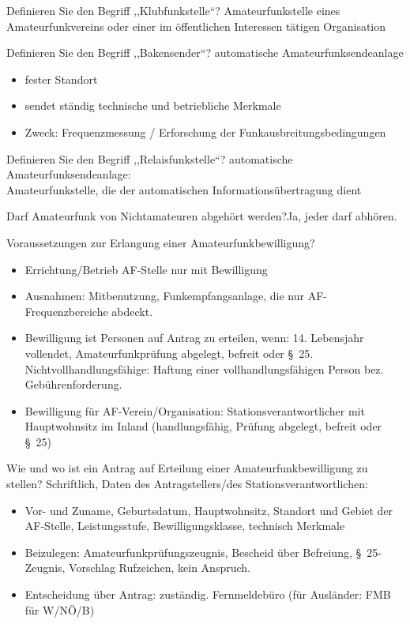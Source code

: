 \documentclass[avery5371,grid,frame,a4paper]{flashcards}
\newcommand{\card}[3]{
  \begin{flashcard}[{\chap} -- #1]{#2}#3\end{flashcard}
}
\begin{document}
\card{22}{Definieren Sie den Begriff ,,Klubfunkstelle``?}{
  Amateurfunkstelle eines Amateurfunkvereins oder einer im öffentlichen Interessen tätigen Organisation
}

\card{23}{Definieren Sie den Begriff ,,Bakensender``?}{
  automatische Amateurfunksendeanlage
  \begin{itemize}
    \item fester Standort
    \item sendet ständig technische und betriebliche Merkmale
    \item Zweck: Frequenzmessung / Erforschung der Funkausbreitungsbedingungen
  \end{itemize}
}

\card{24}{Definieren Sie den Begriff ,,Relaisfunkstelle``?}{
  automatische Amateurfunksendeanlage: \\
  Amateurfunkstelle, die der automatischen Informationsübertragung dient
}

\card{25}{Darf Amateurfunk von Nichtamateuren abgehört werden?}{Ja, jeder darf abhören.}

\card{26}{Voraussetzungen zur Erlangung einer Amateurfunkbewilligung?}{
  \small
  \begin{itemize}
    \item Errichtung/Betrieb AF-Stelle nur mit Bewilligung
    \item Ausnahmen: Mitbenutzung, Funkempfangsanlage, die nur AF-Frequenzbereiche abdeckt.
    \item Bewilligung ist Personen auf Antrag zu erteilen, wenn: 14. Lebensjahr vollendet, Amateurfunkprüfung abgelegt, befreit oder §~25. Nichtvollhandlungsfähige: Haftung einer vollhandlungsfähigen Person bez. Gebührenforderung.
    \item Bewilligung für AF-Verein/Organisation: Stationsverantwortlicher mit Hauptwohnsitz im Inland (handlungsfähig, Prüfung abgelegt, befreit oder §~25)
  \end{itemize}
}

\card{27}{Wie und wo ist ein Antrag auf Erteilung einer Amateurfunkbewilligung zu stellen?}{
  \small
  Schriftlich, Daten des Antragstellers/des Stationsverantwortlichen:
  \begin{itemize}
    \item
      Vor- und Zuname, Geburtsdatum, Hauptwohnsitz, Standort und Gebiet der AF-Stelle,
      Leistungsstufe, Bewilligungsklasse, technisch Merkmale
    \item
      Beizulegen: Amateurfunkprüfungszeugnis, Bescheid über Befreiung, §~25-Zeugnis,
      Vorschlag Rufzeichen, kein Anspruch.
    \item Entscheidung über Antrag: zuständig. Fernmeldebüro (für Ausländer: FMB für W/NÖ/B)
  \end{itemize}
}
\end{document}
